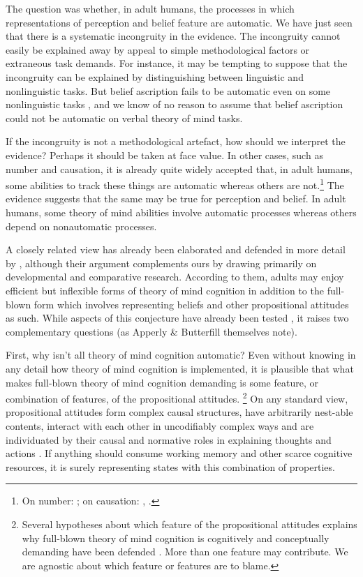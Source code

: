 \documentclass[12pt,\papersize]{extarticle}
\begin{document}
The question was whether, in adult humans, the processes in which representations of perception and belief feature are automatic.  
We have just seen that there is a systematic incongruity in the evidence.
The incongruity  cannot easily be explained away by appeal to simple methodological factors or extraneous task demands.
For instance, it may be tempting to suppose that the incongruity can be explained by distinguishing between linguistic and nonlinguistic tasks.  
But belief ascription fails to be automatic even on some nonlinguistic tasks \citep[e.g.][]{apperly:2004_frontal}, and we know of no reason to assume that belief ascription could not be automatic on verbal theory of mind tasks.

If the incongruity is not a methodological artefact, how should we interpret the evidence?
Perhaps it should be taken at face value.
In other cases, such as number and causation, it is already quite widely accepted that, in adult humans, some abilities to track these things are automatic whereas others are not.\footnote{
On number: \citet{trick:1994_small};
on causation: \citet{Michotte:1946nz}, \citet{Scholl:2004dx}.
}
The evidence suggests that the same may be true for perception and belief.
In adult humans, some theory of mind abilities involve automatic processes whereas others depend on nonautomatic processes. 

A closely related view has already been elaborated and defended in more detail by
\citet[]{Apperly:2009ju},
although their argument complements ours by drawing  primarily on developmental and comparative research. 
According to them,
adults may enjoy efficient but inflexible forms of theory of mind cognition in addition to the full-blown form which involves representing beliefs and other propositional attitudes as such.
While aspects of this conjecture have already been tested \citep[]{Samson:2010jm, en_2397, surtees_direct_2011}, it raises two complementary questions (as Apperly \& Butterfill themselves note).  

First, why isn't all theory of mind cognition automatic?
Even without knowing in any detail how theory of mind cognition is implemented, it is plausible that what makes full-blown theory of mind cognition demanding is some feature, or combination of features, of the propositional attitudes.%
\footnote{
Several hypotheses about which feature of the propositional attitudes explains why full-blown theory of mind cognition is cognitively and conceptually demanding have been defended \citep[e.g.][]{en_1263, en_634, en_1269, en_78, en_81, en_404, 	%
	en_643, en_1130}.  
More than one feature may contribute. 
We are agnostic about which feature or features are to blame.
}  
%
On any standard view, propositional attitudes form complex causal structures, have arbitrarily nest-able contents, interact with each other in uncodifiably complex ways and are individuated by their causal and normative roles in explaining thoughts and actions \citep[]{en_809, en_249}.  If anything should consume working memory and other scarce cognitive resources, it is surely representing states with this combination of properties.
\end{document}
